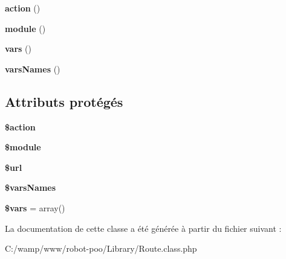 \begin{DoxyCompactItemize}
\item 
\hypertarget{class_library_1_1_route_a8e4800975c151b5d7262a31d6fc9bc33}{{\bfseries action} ()}\label{class_library_1_1_route_a8e4800975c151b5d7262a31d6fc9bc33}

\item 
\hypertarget{class_library_1_1_route_a3772df9066afbc7d7f71397f3f3410be}{{\bfseries module} ()}\label{class_library_1_1_route_a3772df9066afbc7d7f71397f3f3410be}

\item 
\hypertarget{class_library_1_1_route_ab7761618ce506ccb0903fbb983312ab6}{{\bfseries vars} ()}\label{class_library_1_1_route_ab7761618ce506ccb0903fbb983312ab6}

\item 
\hypertarget{class_library_1_1_route_a4c2c2bb63da06304fe2482c2f82593f2}{{\bfseries vars\+Names} ()}\label{class_library_1_1_route_a4c2c2bb63da06304fe2482c2f82593f2}

\end{DoxyCompactItemize}
\subsection*{Attributs protégés}
\begin{DoxyCompactItemize}
\item 
\hypertarget{class_library_1_1_route_aa698a3e72116e8e778be0e95d908ee30}{{\bfseries \$action}}\label{class_library_1_1_route_aa698a3e72116e8e778be0e95d908ee30}

\item 
\hypertarget{class_library_1_1_route_ac531301c55a8d8b6c7613597218ff482}{{\bfseries \$module}}\label{class_library_1_1_route_ac531301c55a8d8b6c7613597218ff482}

\item 
\hypertarget{class_library_1_1_route_acf215f34a917d014776ce684a9ee8909}{{\bfseries \$url}}\label{class_library_1_1_route_acf215f34a917d014776ce684a9ee8909}

\item 
\hypertarget{class_library_1_1_route_abe91bbe3ce3517143e6678e872fd30d2}{{\bfseries \$vars\+Names}}\label{class_library_1_1_route_abe91bbe3ce3517143e6678e872fd30d2}

\item 
\hypertarget{class_library_1_1_route_a09f2c833c130b4443725fb576d9d5269}{{\bfseries \$vars} = array()}\label{class_library_1_1_route_a09f2c833c130b4443725fb576d9d5269}

\end{DoxyCompactItemize}


La documentation de cette classe a été générée à partir du fichier suivant \+:\begin{DoxyCompactItemize}
\item 
C\+:/wamp/www/robot-\/poo/\+Library/Route.\+class.\+php\end{DoxyCompactItemize}

